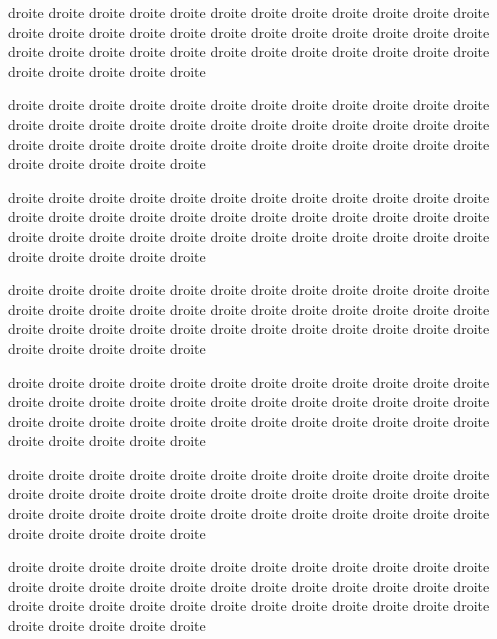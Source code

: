 \documentclass[12pt]{book}
\begin{document}
\begin{pages}
\begin{Rightside}
\pstart
\begin{ledgroup}
droite droite droite droite droite droite droite droite droite droite droite droite droite droite droite droite droite droite droite droite droite droite droite droite droite droite droite droite droite droite droite droite droite droite droite droite droite droite droite droite droite

droite droite droite droite droite droite droite droite droite droite droite droite droite droite droite droite droite droite droite droite droite droite droite droite droite droite droite droite droite droite droite droite droite droite droite droite droite droite droite droite droite

\end{ledgroup}
\pend
\pstart
\begin{ledgroup}
droite droite droite droite droite droite droite droite droite droite droite droite droite droite droite droite droite droite droite droite droite droite droite droite droite droite droite droite droite droite droite droite droite droite droite droite droite droite droite droite droite

droite droite droite droite droite droite droite droite droite droite droite droite droite droite droite droite droite droite droite droite droite droite droite droite droite droite droite droite droite droite droite droite droite droite droite droite droite droite droite droite droite 
\end{ledgroup}
\pend

\pstart
\begin{ledgroup}
droite droite droite droite droite droite droite droite droite droite droite droite droite droite droite droite droite droite droite droite droite droite droite droite droite droite droite droite droite droite droite droite droite droite droite droite droite droite droite droite droite

droite droite droite droite droite droite droite droite droite droite droite droite droite droite droite droite droite droite droite droite droite droite droite droite droite droite droite droite droite droite droite droite droite droite droite droite droite droite droite droite droite

droite droite droite droite droite droite droite droite droite droite droite droite droite droite droite droite droite droite droite droite droite droite droite droite droite droite droite droite droite droite droite droite droite droite droite droite droite droite droite droite droite 
\end{ledgroup}
\pend


\end{Rightside}
\end{pages}
\end{document}
